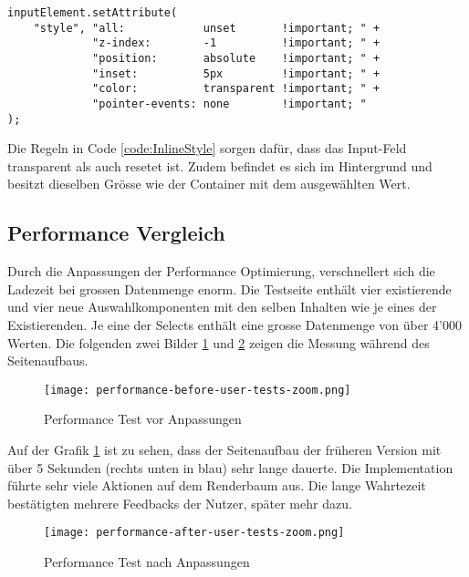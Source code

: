 \begin{lstlisting}[style = htmlcssjs, caption = Inline-Style für Input-Feld, label = code:InlineStyle]
inputElement.setAttribute(
    "style", "all:            unset       !important; " +
             "z-index:        -1          !important; " +
             "position:       absolute    !important; " +
             "inset:          5px         !important; " +
             "color:          transparent !important; " +
             "pointer-events: none        !important; "
);
\end{lstlisting}

Die Regeln in Code \ref{code:InlineStyle} sorgen dafür, dass das Input-Feld transparent als auch resetet ist.
Zudem befindet es sich im Hintergrund und besitzt dieselben Grösse wie der Container mit dem ausgewählten Wert.

\subsection{Performance Vergleich}
\label{sec:performanceCompare}

Durch die Anpassungen der Performance Optimierung, verschnellert sich die Ladezeit bei grossen Datenmenge enorm.
Die Testseite enthält vier existierende und vier neue Auswahlkomponenten mit den selben Inhalten wie je eines der Existierenden.
Je eine der Selects enthält eine grosse Datenmenge von über 4'000 Werten.
Die folgenden zwei Bilder \ref{img:PerformanceTestBefore} und \ref{img:PerformanceTestAfter} zeigen die Messung während des Seitenaufbaus.

\begin{figure}[!htb]
    \centering
    \texttt{[image: performance-before-user-tests-zoom.png]}
    \caption{Performance Test vor Anpassungen}
    \label{img:PerformanceTestBefore}
\end{figure}

Auf der Grafik \ref{img:PerformanceTestBefore} ist zu sehen, dass der Seitenaufbau der früheren Version mit über 5 Sekunden (rechts unten in blau) sehr lange dauerte. 
Die Implementation führte sehr viele Aktionen auf dem Renderbaum aus.
Die lange Wahrtezeit bestätigten mehrere Feedbacks der Nutzer, später mehr dazu.

\begin{figure}[!htb]
    \centering
    \texttt{[image: performance-after-user-tests-zoom.png]}
    \caption{Performance Test nach Anpassungen}
    \label{img:PerformanceTestAfter}
\end{figure}

